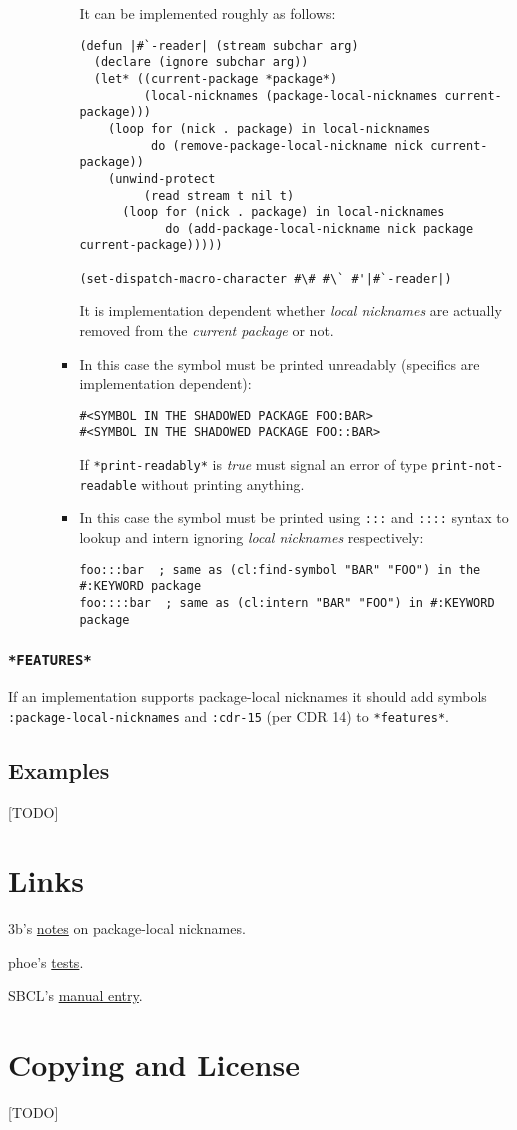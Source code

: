 \documentclass[11pt]{article}
\begin{document}
\begin{enumerate}
\begin{enumerate}
\begin{itemize}
It can be implemented roughly as follows:
\begin{verbatim}
(defun |#`-reader| (stream subchar arg)
  (declare (ignore subchar arg))
  (let* ((current-package *package*)
         (local-nicknames (package-local-nicknames current-package)))
    (loop for (nick . package) in local-nicknames
          do (remove-package-local-nickname nick current-package))
    (unwind-protect
         (read stream t nil t)
      (loop for (nick . package) in local-nicknames
            do (add-package-local-nickname nick package current-package)))))

(set-dispatch-macro-character #\# #\` #'|#`-reader|)
\end{verbatim}
It is implementation dependent whether \emph{local nicknames} are actually
removed from the \emph{current package} or not.
\item In this case the symbol must be printed unreadably (specifics are
implementation dependent):
\begin{verbatim}
#<SYMBOL IN THE SHADOWED PACKAGE FOO:BAR>
#<SYMBOL IN THE SHADOWED PACKAGE FOO::BAR>
\end{verbatim}

If \texttt{*print-readably*} is \emph{true} must signal an error of type
\texttt{print-not-readable} without printing anything.
\item In this case the symbol must be printed using \texttt{:::} and \texttt{::::} syntax
to lookup and intern ignoring \emph{local nicknames} respectively:
\begin{verbatim}
foo:::bar  ; same as (cl:find-symbol "BAR" "FOO") in the #:KEYWORD package
foo::::bar  ; same as (cl:intern "BAR" "FOO") in #:KEYWORD package
\end{verbatim}
\end{itemize}
\end{enumerate}
\end{enumerate}
\subsubsection{\texttt{*FEATURES*}}
\label{sec:orgb4a4504}
If an implementation supports package-local nicknames it should add symbols
\texttt{:package-local-nicknames} and \texttt{:cdr-15} (per CDR 14) to \texttt{*features*}.
\subsection{Examples}
\label{sec:org1491a6f}
[TODO]
\section{Links}
\label{sec:orga2783a2}
3b's \href{https://github.com/3b/package-local-nicknames/blob/master/docs.org}{notes} on package-local nicknames.

phoe's \href{https://github.com/phoe/trivial-package-local-nicknames}{tests}.

SBCL's \href{https://www.sbcl.org/manual/\#Package\_002dLocal-Nicknames}{manual entry}.
\section{Copying and License}
\label{sec:org3e22827}
[TODO]
\end{document}
